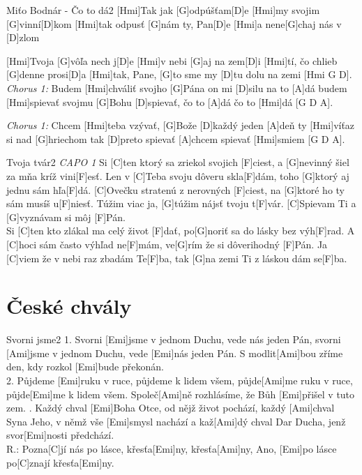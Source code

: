 \documentclass[12pt]{article}
\begin{document}
\begin{song}{Miťo Bodnár - Čo to dá}{2}
	[Hmi]Tak jak [G]odpúšťam[D]e
	[Hmi]my svojim [G]vinní[D]kom
	[Hmi]tak odpusť [G]nám ty, Pan[D]e
	[Hmi]a nene[G]chaj nás v [D]zlom
	
	[Hmi]Tvoja [G]vôľa nech j[D]e
	[Hmi]v nebi [G]aj na zem[D]i
	[Hmi]tí, čo chlieb [G]denne prosi[D]a
	[Hmi]tak, Pane, [G]to sme my
	[D]tu dolu na zemi [Hmi G D].
	\columnbreak
	\textit{\color{gray}Chorus 1:}
	Budem [Hmi]chváliť svojho [G]Pána
	on mi [D]silu na to [A]dá
	budem [Hmi]spievať svojmu [G]Bohu
	[D]spievať, čo to [A]dá
	čo to [Hmi]dá [G D A].
	
	\textit{\color{gray}Chorus 1:}
	Chcem [Hmi]teba vzývať, [G]Bože
	[D]každý jeden [A]deň
	ty [Hmi]víťaz si nad [G]hriechom
	tak [D]preto spievať [A]chcem
	spievať [Hmi]smiem [G D A].
\end{song}


\begin{song}{Tvoja tvár}{2}
	\textit{\color{gray}CAPO 1}
	Si [C]ten ktorý sa zriekol svojich [F]ciest,
	a [G]nevinný šiel za mňa kríž vini[F]esť.
	Len v [C]Teba svoju dôveru skla[F]dám,
	toho [G]ktorý aj jednu sám hľa[F]dá.
	[C]Ovečku stratenú z nerovných [F]ciest,
	na [G]ktoré ho ty sám musíš u[F]niesť.
	\columnbreak
	[C]Túžim viac ja, [G]túžim nájsť tvoju t[F]vár.
	[C]Spievam Ti a [G]vyznávam si môj [F]Pán.
	\\
	Si [C]ten kto zlákal ma celý život [F]dať,
	po[G]noriť sa do lásky bez výh[F]rad.
	A [C]hoci sám často výhľad ne[F]mám,
	ve[G]rím že si dôverihodný [F]Pán.
	Ja [C]viem že v nebi raz zbadám Te[F]ba,
	tak [G]na zemi Ti z láskou dám se[F]ba.
\end{song}

\newpage

\section{České chvály}
	
\begin{song}{Svorni jsme}{2}
	1. Svorni [Emi]jsme v jednom Duchu, 
	vede nás jeden Pán,
	svorni [Ami]jsme v jednom Duchu, 
	vede [Emi]nás jeden Pán.
	S modlit[Ami]bou zříme den, 
	kdy rozkol [Emi]bude překonán.
	\\
	2. Půjdeme [Emi]ruku v ruce, 
	půjdeme k lidem všem,
	půjde[Ami]me ruku v ruce, 
	půjde[Emi]me k lidem všem.
	Společ[Ami]ně rozhlásíme, 
	že Bůh [Emi]přišel v tuto zem.
	. Každý chval [Emi]Boha Otce, 
	od nějž život pochází,
	každý [Ami]chval Syna Jeho, 
	v němž vše [Emi]smysl nachází
	a kaž[Ami]dý chval Dar Ducha, 
	jenž svor[Emi]nosti předchází.
	\\
	R.: Pozna[C]jí nás po lásce, 
	křesťa[Emi]ny, křesťa[Ami]ny,
	Ano, [Emi]po lásce po[C]znají křesťa[Emi]ny.
\end{song}
\end{document}
